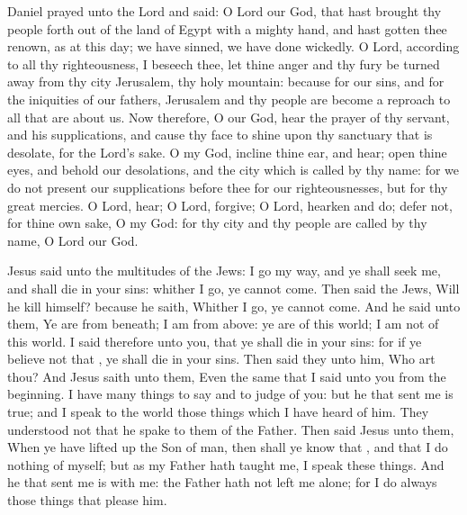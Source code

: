  Daniel prayed unto the Lord and said: O Lord our God, that hast brought thy people forth out of the land of Egypt with a mighty hand, and hast gotten thee renown, as at this day; we have sinned, we have done wickedly. O Lord, according to all thy righteousness, I beseech thee, let thine anger and thy fury be turned away from thy city Jerusalem, thy holy mountain: because for our sins, and for the iniquities of our fathers, Jerusalem and thy people are become a reproach to all that are about us. Now therefore, O our God, hear the prayer of thy servant, and his supplications, and cause thy face to shine upon thy sanctuary that is desolate, for the Lord's sake. O my God, incline thine ear, and hear; open thine eyes, and behold our desolations, and the city which is called by thy name: for we do not present our supplications before thee for our righteousnesses, but for thy great mercies. O Lord, hear; O Lord, forgive; O Lord, hearken and do; defer not, for thine own sake, O my God: for thy city and thy people are called by thy name, O Lord our God.


 Jesus said unto the multitudes of the Jews: I go my way, and ye shall seek me, and shall die in your sins: whither I go, ye cannot come. Then said the Jews, Will he kill himself? because he saith, Whither I go, ye cannot come. And he said unto them, Ye are from beneath; I am from above: ye are of this world; I am not of this world. I said therefore unto you, that ye shall die in your sins: for if ye believe not that , ye shall die in your sins. Then said they unto him, Who art thou? And Jesus saith unto them, Even the same that I said unto you from the beginning. I have many things to say and to judge of you: but he that sent me is true; and I speak to the world those things which I have heard of him. They understood not that he spake to them of the Father. Then said Jesus unto them, When ye have lifted up the Son of man, then shall ye know that , and that I do nothing of myself; but as my Father hath taught me, I speak these things. And he that sent me is with me: the Father hath not left me alone; for I do always those things that please him.

